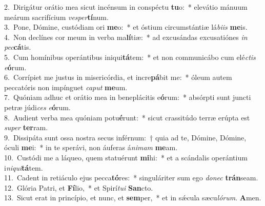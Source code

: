 {2.~}Dirigátur orátio mea sicut incénsum in conspéctu \textbf{tu}o:~* elevátio mánuum meárum sacrifícium \textit{ve}\textit{sper}\textbf{tí}num.\\
{3.~}Pone, Dómine, custódiam ori \textbf{me}o:~* et óstium circumstántiæ lá\textit{bi}\textit{is} \textbf{me}is.\\
{4.~}Non declínes cor meum in verba ma\textbf{lí}tiæ:~* ad excusándas excusatiónes \textit{in} \textit{pec}\textbf{cá}tis.\\
{5.~}Cum homínibus operántibus iniqui\textbf{tá}tem:~* et non communicábo cum elé\textit{ctis} \textit{e}\textbf{ó}rum.\\
{6.~}Corrípiet me justus in misericórdia, et incre\textbf{pá}bit me:~* óleum autem peccatóris non impínguet \textit{ca}\textit{put} \textbf{me}um.\\
{7.~}Quóniam adhuc et orátio mea in beneplácitis e\textbf{ó}rum:~* absórpti sunt juncti petræ júdi\textit{ces} \textit{e}\textbf{ó}rum.\\
{8.~}Audient verba mea quóniam potu\textbf{é}runt:~* sicut crassitúdo terræ erúpta est \textit{su}\textit{per} \textbf{ter}ram.\\
{9.~}Dissipáta sunt ossa nostra secus inférnum:~† quia ad te, Dómine, Dómine, óculi \textbf{me}i:~* in te sperávi, non áuferas á\textit{ni}\textit{mam} \textbf{me}am.\\
{10.~}Custódi me a láqueo, quem statuérunt \textbf{mi}hi:~* et a scándalis operántium i\textit{ni}\textit{qui}\textbf{tá}tem.\\
{11.~}Cadent in retiáculo ejus pecca\textbf{tó}res:~* singuláriter sum ego \textit{do}\textit{nec} \textbf{trán}seam.\\
{12.~}Glória Patri, et \textbf{Fí}lio,~* et Spirí\textit{tu}\textit{i} \textbf{San}cto.\\
{13.~}Sicut erat in princípio, et nunc, et \textbf{sem}per,~* et in sǽcula sæcu\textit{ló}\textit{rum}. \textbf{A}men.\\
